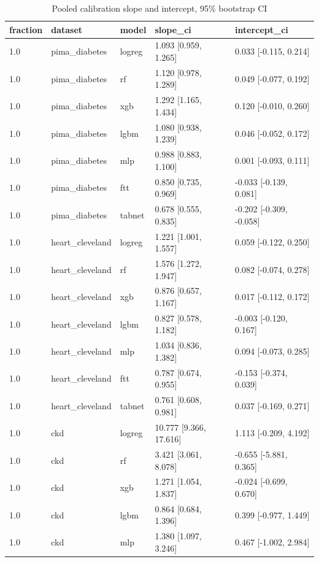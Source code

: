 \begin{table}[t]
\centering
\scriptsize
\caption{Pooled calibration slope and intercept, 95\% bootstrap CI}
\begin{tabular}{lllll}
\toprule
fraction & dataset & model & slope\_ci & intercept\_ci \\
\midrule
1.0 & pima\_diabetes & logreg & 1.093 [0.959, 1.265] & 0.033 [-0.115, 0.214] \\
1.0 & pima\_diabetes & rf & 1.120 [0.978, 1.289] & 0.049 [-0.077, 0.192] \\
1.0 & pima\_diabetes & xgb & 1.292 [1.165, 1.434] & 0.120 [-0.010, 0.260] \\
1.0 & pima\_diabetes & lgbm & 1.080 [0.938, 1.239] & 0.046 [-0.052, 0.172] \\
1.0 & pima\_diabetes & mlp & 0.988 [0.883, 1.100] & 0.001 [-0.093, 0.111] \\
1.0 & pima\_diabetes & ftt & 0.850 [0.735, 0.969] & -0.033 [-0.139, 0.081] \\
1.0 & pima\_diabetes & tabnet & 0.678 [0.555, 0.835] & -0.202 [-0.309, -0.058] \\
1.0 & heart\_cleveland & logreg & 1.221 [1.001, 1.557] & 0.059 [-0.122, 0.250] \\
1.0 & heart\_cleveland & rf & 1.576 [1.272, 1.947] & 0.082 [-0.074, 0.278] \\
1.0 & heart\_cleveland & xgb & 0.876 [0.657, 1.167] & 0.017 [-0.112, 0.172] \\
1.0 & heart\_cleveland & lgbm & 0.827 [0.578, 1.182] & -0.003 [-0.120, 0.167] \\
1.0 & heart\_cleveland & mlp & 1.034 [0.836, 1.382] & 0.094 [-0.073, 0.285] \\
1.0 & heart\_cleveland & ftt & 0.787 [0.674, 0.955] & -0.153 [-0.374, 0.039] \\
1.0 & heart\_cleveland & tabnet & 0.761 [0.608, 0.981] & 0.037 [-0.169, 0.271] \\
1.0 & ckd & logreg & 10.777 [9.366, 17.616] & 1.113 [-0.209, 4.192] \\
1.0 & ckd & rf & 3.421 [3.061, 8.078] & -0.655 [-5.881, 0.365] \\
1.0 & ckd & xgb & 1.271 [1.054, 1.837] & -0.024 [-0.699, 0.670] \\
1.0 & ckd & lgbm & 0.864 [0.684, 1.396] & 0.399 [-0.977, 1.449] \\
1.0 & ckd & mlp & 1.380 [1.097, 3.246] & 0.467 [-1.002, 2.984] \\

\end{tabular}
\end{table}
